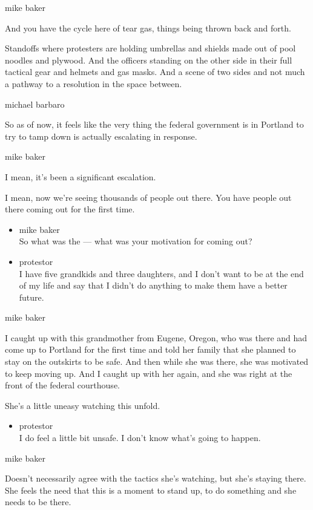 mike baker

And you have the cycle here of tear gas, things being thrown back and
forth.

Standoffs where protesters are holding umbrellas and shields made out of
pool noodles and plywood. And the officers standing on the other side in
their full tactical gear and helmets and gas masks. And a scene of two
sides and not much a pathway to a resolution in the space between.

michael barbaro

So as of now, it feels like the very thing the federal government is in
Portland to try to tamp down is actually escalating in response.

mike baker

I mean, it's been a significant escalation.

I mean, now we're seeing thousands of people out there. You have people
out there coming out for the first time.

\begin{itemize}
\item
  mike baker\\
  So what was the --- what was your motivation for coming out?
\item
  protestor\\
  I have five grandkids and three daughters, and I don't want to be at
  the end of my life and say that I didn't do anything to make them have
  a better future.
\end{itemize}

mike baker

I caught up with this grandmother from Eugene, Oregon, who was there and
had come up to Portland for the first time and told her family that she
planned to stay on the outskirts to be safe. And then while she was
there, she was motivated to keep moving up. And I caught up with her
again, and she was right at the front of the federal courthouse.

She's a little uneasy watching this unfold.

\begin{itemize}
\tightlist
\item
  protestor\\
  I do feel a little bit unsafe. I don't know what's going to happen.
\end{itemize}

mike baker

Doesn't necessarily agree with the tactics she's watching, but she's
staying there. She feels the need that this is a moment to stand up, to
do something and she needs to be there.

